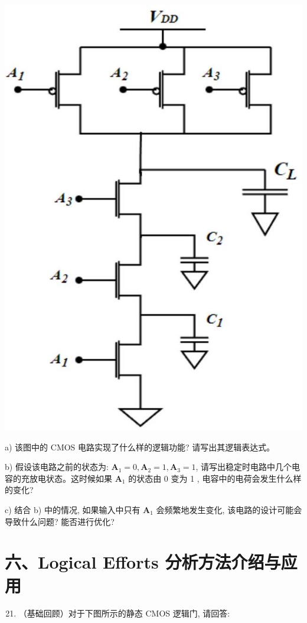 \documentclass[10pt]{article}
\begin{document}
\begin{center}
\includegraphics[max width=\textwidth]{2024_05_20_f1af48ad54173fe448ecg-5(1)}
\end{center}

a) 该图中的 CMOS 电路实现了什么样的逻辑功能? 请写出其逻辑表达式。

b) 假设该电路之前的状态为: $\boldsymbol{A}_{1}=0, \boldsymbol{A}_{2}=1, \boldsymbol{A}_{3}=1$, 请写出稳定时电路中几个电容的充放电状态。这时候如果 $\boldsymbol{A}_{1}$ 的状态由 0 变为 1 , 电容中的电荷会发生什么样的变化?

c) 结合 b) 中的情况, 如果输入中只有 $\boldsymbol{A}_{1}$ 会频繁地发生变化, 该电路的设计可能会导致什么问题? 能否进行优化?

\section*{六、Logical Efforts 分析方法介绍与应用}
\begin{enumerate}
  \setcounter{enumi}{20}
  \item （基础回顾）对于下图所示的静态 CMOS 逻辑门, 请回答:
\end{enumerate}
\end{document}
